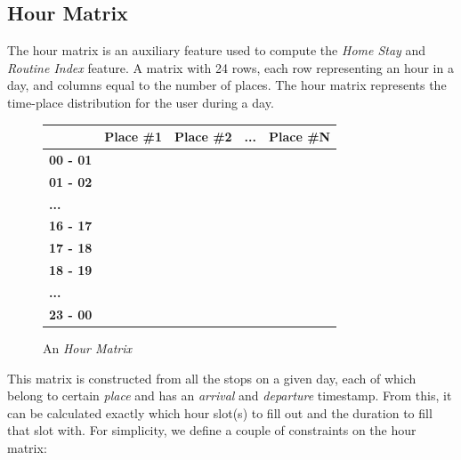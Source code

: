 \subsection{Hour Matrix}
\label{sub:hour-matrix}
The hour matrix is an auxiliary feature used to compute the \textit{Home Stay} and \textit{Routine Index} feature. A matrix with 24 rows, each row representing an hour in a day, and columns equal to the number of places. The hour matrix represents the time-place distribution for the user during a day.
\begin{figure}
    \centering
    \begin{tabular}{|l|l|l|l|l|}
    \hline
    \textbf{}        & \textbf{Place \#1} & \textbf{Place \#2} & \textbf{...} & \textbf{Place \#N} \\ \hline
    \textbf{00 - 01} &                    &                    &              &                    \\ \hline
    \textbf{01 - 02} &                    &                    &              &                    \\ \hline
    \textbf{...}     &                    &                    &              &                    \\ \hline
    \textbf{16 - 17} &                    &                    &              &                    \\ \hline
    \textbf{17 - 18} &                    &                    &              &                    \\ \hline
    \textbf{18 - 19} &                    &                    &              &                    \\ \hline
    \textbf{...}     &                    &                    &              &                    \\ \hline
    \textbf{23 - 00} &                    &                    &              &                    \\ \hline
    \end{tabular}
    \caption{An \textit{Hour Matrix}}
    \label{fig:time-table}
\end{figure}

This matrix is constructed from all the stops on a given day, each of which belong to certain \textit{place} and has an \textit{arrival} and \textit{departure} timestamp. From this, it can be calculated exactly which hour slot(s) to fill out and the duration to fill that slot with. For simplicity, we define a couple of constraints on the hour matrix:

